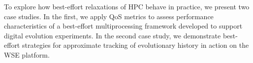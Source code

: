 To explore how best-effort relaxations of HPC behave in practice, we present two case studies.
In the first, we apply QoS metrics to assess performance characteristics of a best-effort multiprocessing framework developed to support digital evolution experiments.
In the second case study, we demonstrate best-effort strategies for approximate tracking of evolutionary history in action on the WSE platform.








